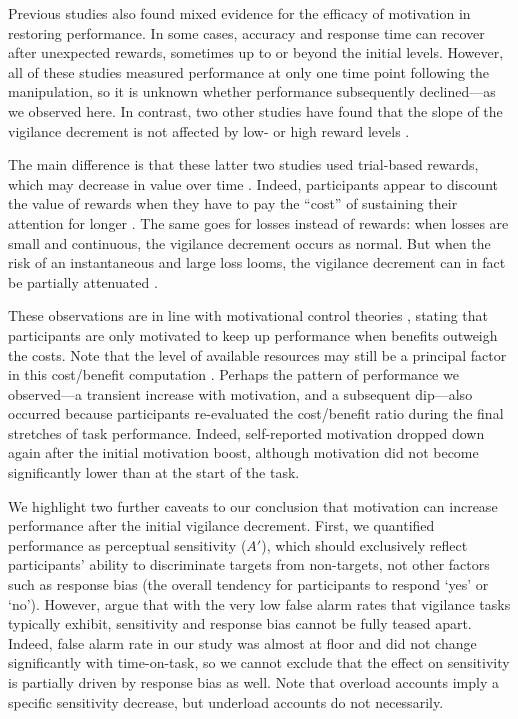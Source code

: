 \documentclass[11pt,english,]{memoir}
\begin{document}
Previous studies also found mixed evidence for the efficacy of motivation in restoring performance. In some cases, accuracy \autocite{Hopstaken2015} and response time \autocites{Boksem2006}{Lorist2009} can recover after unexpected rewards, sometimes up to or beyond the initial levels. However, all of these studies measured performance at only one time point following the manipulation, so it is unknown whether performance subsequently declined---as we observed here. In contrast, two other studies have found that the slope of the vigilance decrement is not affected by low- or high reward levels \autocites{Esterman2014}{Gergelyfi2015}.

The main difference is that these latter two studies used trial-based rewards, which may decrease in value over time \autocite{Fortenbaugh2017}. Indeed, participants appear to discount the value of rewards when they have to pay the ``cost'' of sustaining their attention for longer \autocite{Massar2016}. The same goes for losses instead of rewards: when losses are small and continuous, the vigilance decrement occurs as normal. But when the risk of an instantaneous and large loss looms, the vigilance decrement can in fact be partially attenuated \autocite{Esterman2016}.

These observations are in line with motivational control theories \autocites{Hockey1997}{Kurzban2013}, stating that participants are only motivated to keep up performance when benefits outweigh the costs. Note that the level of available resources may still be a principal factor in this cost/benefit computation \autocites{Boksem2008}{Christie2015}. Perhaps the pattern of performance we observed---a transient increase with motivation, and a subsequent dip---also occurred because participants re-evaluated the cost/benefit ratio during the final stretches of task performance. Indeed, self-reported motivation dropped down again after the initial motivation boost, although motivation did not become significantly lower than at the start of the task.

We highlight two further caveats to our conclusion that motivation can increase performance after the initial vigilance decrement. First, we quantified performance as perceptual sensitivity (\(A'\)), which should exclusively reflect participants' ability to discriminate targets from non-targets, not other factors such as response bias (the overall tendency for participants to respond `yes' or `no'). However, \textcite{Thomson2016} argue that with the very low false alarm rates that vigilance tasks typically exhibit, sensitivity and response bias cannot be fully teased apart. Indeed, false alarm rate in our study was almost at floor and did not change significantly with time-on-task, so we cannot exclude that the effect on sensitivity is partially driven by response bias as well. Note that overload accounts imply a specific sensitivity decrease, but underload accounts do not necessarily.
\end{document}

